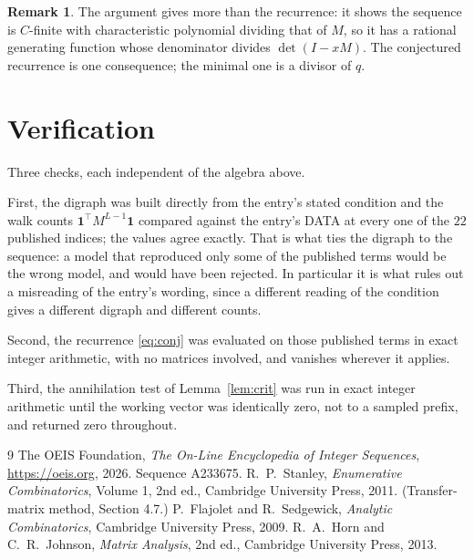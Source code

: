 \documentclass[11pt,a4paper]{article}
\theoremstyle{plain}
\theoremstyle{definition}
\newtheorem{remark}[theorem]{Remark}
\begin{document}
\begin{remark}
The argument gives more than the recurrence: it shows the sequence is $C$-finite with
characteristic polynomial dividing that of $M$, so it has a rational generating function
whose denominator divides $\det(I-xM)$. The conjectured recurrence is one consequence; the
minimal one is a divisor of $q$.
\end{remark}

\section{Verification}

Three checks, each independent of the algebra above.

First, the digraph was built directly from the entry's stated condition and the walk counts
$\mathbf{1}^{\!\top}M^{L-1}\mathbf{1}$ compared against the entry's DATA at
every one of the $22$ published indices; the values agree exactly. That is what ties
the digraph to the sequence: a model that reproduced only some of the published terms would
be the wrong model, and would have been rejected. In particular it is what rules out a
misreading of the entry's wording, since a different reading of the condition gives a
different digraph and different counts.

Second, the recurrence \eqref{eq:conj} was evaluated on those published terms in exact
integer arithmetic, with no matrices involved, and vanishes wherever it applies.

Third, the annihilation test of Lemma~\ref{lem:crit} was run in exact integer arithmetic
until the working vector was identically zero, not to a sampled prefix, and returned zero
throughout.

\begin{thebibliography}{9}
 The OEIS Foundation, \emph{The On-Line Encyclopedia of Integer
Sequences}, \url{https://oeis.org}, 2026. Sequence A233675.
 R.~P.~Stanley, \emph{Enumerative Combinatorics}, Volume 1, 2nd ed.,
Cambridge University Press, 2011. (Transfer-matrix method, Section 4.7.)
 P.~Flajolet and R.~Sedgewick, \emph{Analytic Combinatorics}, Cambridge
University Press, 2009.
 R.~A.~Horn and C.~R.~Johnson, \emph{Matrix Analysis}, 2nd ed., Cambridge
University Press, 2013.
\end{thebibliography}
\end{document}
